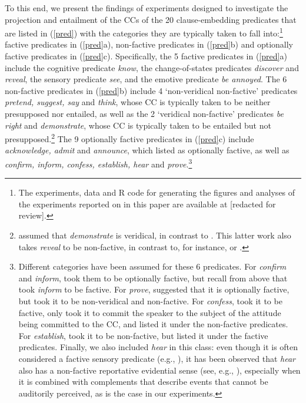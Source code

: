 \documentclass[11pt,fleqn]{article}
\newcommand{\6}{\mbox{$[\hspace*{-.6mm}[$}}
\newcommand{\9}{\mbox{$]\hspace*{-.6mm}]$}}
\begin{document}
To this end, we present the findings of experiments designed to investigate the projection and entailment of the CCs of the 20 clause-embedding predicates  that are listed in (\ref{pred}) with the categories they are typically taken to fall into:\footnote{\label{f-github}The experiments, data and R code for generating the figures and analyses of the experiments reported on in this paper are available at [redacted for review].}
factive predicates in (\ref{pred}a), non-factive predicates in (\ref{pred}b) and optionally factive predicates in (\ref{pred}c). Specifically, the 5 factive predicates in (\ref{pred}a) include the cognitive predicate {\em know}, the change-of-states predicates {\em discover} and {\em reveal}, the sensory predicate {\em see}, and the emotive predicate {\em be annoyed}. The 6 non-factive predicates in (\ref{pred}b) include 4 `non-veridical non-factive' predicates {\em pretend, suggest, say} and {\em think}, whose CC is typically taken to be neither presupposed nor entailed, as well as  the 2 `veridical non-factive' predicates {\em be right} and {\em demonstrate}, whose CC is typically taken to be entailed but not presupposed.\footnote{\citet{anand-hacquard2014} assumed that {\em demonstrate} is veridical, in contrast to \citealt{anand-etal2019}. This latter work also takes {\em reveal} to be non-factive, in contrast to, for instance, \citealt{egre2008,wyse} or \citealt{tbd-variability}.}  The 9 optionally factive predicates in (\ref{pred}c) include {\em acknowledge, admit} and {\em announce}, which \citealt{kiparsky-kiparsky70} listed as optionally factive, as well as {\em confirm, inform, confess, establish, hear} and {\em prove}.\footnote{Different categories have been assumed for these 6 predicates. For {\em confirm} and {\em inform}, \citet{anand-hacquard2014} took them to be optionally factive, but recall from above that \citet{schlenker10} took {\em inform} to be factive. For {\em prove}, \citet{white-rawlins-nels2018} suggested that it is optionally factive, but \citet{anand-hacquard2014} took it to be non-veridical and non-factive. For {\em confess}, \citet{swanson2012} took it to be factive, \citet{karttunen2016} only took it to commit the speaker to the subject of the attitude being committed to the CC, and \citet{wyse} listed it under the non-factive predicates. For {\em establish}, \citet{swanson2012} took it to be non-factive, but \citet{wyse} listed it under the factive predicates. Finally, we also included {\em hear} in this class: even though it is often considered a factive sensory predicate (e.g., \citealt{beaver-belly,anand-hacquard2014}), it has been observed that {\em hear} also has a non-factive reportative evidential sense (see, e.g., \citealt{anderson86,simons07}), especially when it is combined with complements that describe events that cannot be auditorily perceived, as is the case in our experiments.}
\end{document}
